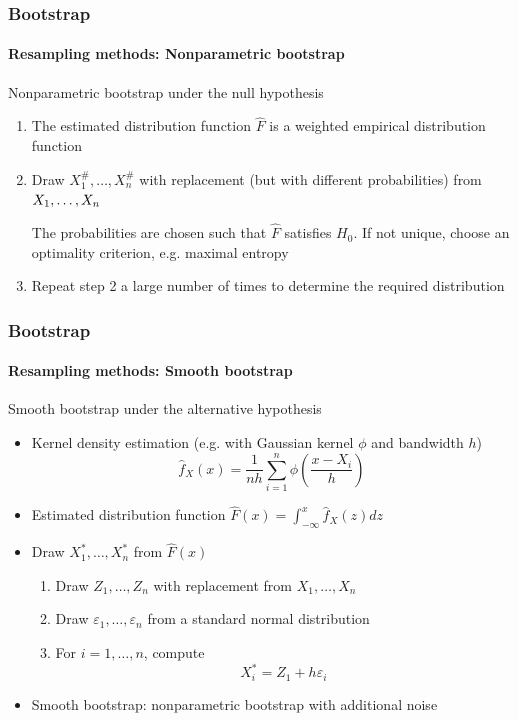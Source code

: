 \documentclass[smaller,compress]{beamer}
\begin{document}
\begin{frame}\frametitle{Bootstrap}\framesubtitle{Resampling methods: Nonparametric bootstrap}
Nonparametric bootstrap under the null hypothesis
\begin{enumerate}
    \item The estimated distribution function $\hat{F}$ is a weighted empirical distribution function
    \item Draw $X_{1}^{\#},\dots ,X_{n}^{\#}$ with replacement (but with different probabilities) from $X_{1},\ldots ,X_{n}\medskip $

    The probabilities are chosen such that $\hat{F}$ satisfies $H_{0}$. If not unique, choose an optimality criterion, e.g. maximal entropy

    \item Repeat step 2 a large number of times to determine the required distribution
\end{enumerate}
\end{frame}


\begin{frame}\frametitle{Bootstrap}\framesubtitle{Resampling methods: Smooth bootstrap}
Smooth bootstrap under the alternative hypothesis
\begin{itemize}
    \item Kernel density estimation (e.g. with Gaussian kernel $\phi $ and bandwidth $h$)
    \begin{equation*}
    \hat{f}_{X}(x)=\frac{1}{nh}\sum_{i=1}^{n}\phi \left( \frac{x-X_{i}}{h}\right)
    \end{equation*}
    \item Estimated distribution function $\hat{F}(x)=\int_{-\infty }^{x}\hat{f}_{X}(z)dz$
    \item Draw $X_{1}^{\ast },\ldots ,X_{n}^{\ast }$ from $\hat{F}(x)$
    \begin{enumerate}
    \item Draw $Z_{1},\ldots ,Z_{n}$ with replacement from $X_{1},\ldots ,X_{n}$
    \item Draw $\varepsilon _{1},\ldots ,\varepsilon _{n}$ from a standard normal distribution
    \item For $i=1,\ldots ,n$, compute
    \begin{equation*}
    X_{i}^{\ast }=Z_{1}+h\varepsilon _{i}
    \end{equation*}
    \end{enumerate}
    \item Smooth bootstrap: nonparametric bootstrap with additional noise
\end{itemize}
\end{frame}
\end{document}
